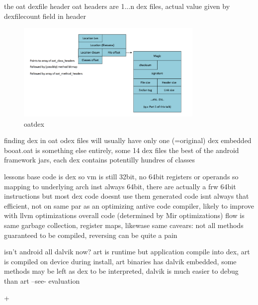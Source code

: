 the oat dexfile header
oat headers are 1...n dex files, actual value given by dexfilecount field in header
\begin{figure}[h]
    \centering
    \includegraphics[width=0.8\textwidth]{data/oatdex.png}
    \caption{oatdex}
    \label{fig:awesome_image122223}
\end{figure}


finding dex in oat
odex files will usually have only one (=original) dex embedded
booat.oat is something else entirely, some 14 dex files the best of the android framework jars, each dex contains potentilly hundres of classes



lessons
base code is dex so vm is still 32bit, no 64bit registers or operands so mapping to underlying arch inst always 64bit, there are actually a frw 64bit instructions but most dex code doesnt use them
generated code isnt always that efficient, not on same par as an optimizing antive code compiler, likely to improve with llvm optimizations
overall code (determined by Mir optimizations) flow is same
garbage collection, register maps, likewase same
cavears: not all methods guaranteed to be compiled, reversing can be quite a pain
\newline


isn't android all dalvik now?
art is runtime but application compile into dex, art is compiled on device during install, art binaries has dalvik embedded, some methods may be left as dex to be interpreted, dalvik is much easier to debug than art --see- evaluation \newline
\cite{andevconDalvikART}
%

+

